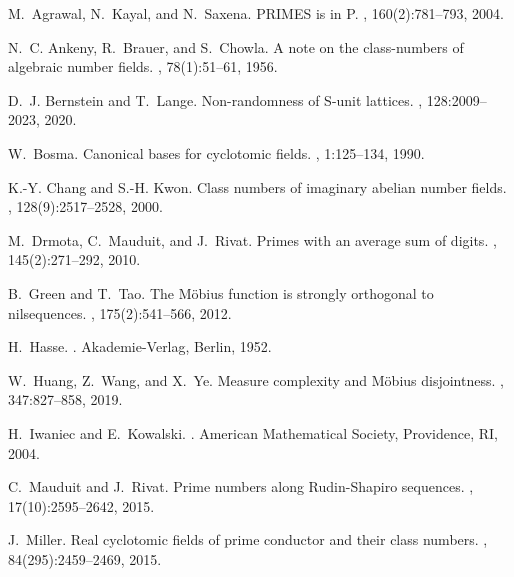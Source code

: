 
\begin{thebibliography}{30}

M.~Agrawal, N.~Kayal, and N.~Saxena.
\newblock PRIMES is in P.
, 160(2):781--793, 2004.

N.~C. Ankeny, R.~Brauer, and S.~Chowla.
\newblock A note on the class-numbers of algebraic number fields.
, 78(1):51--61, 1956.

D.~J. Bernstein and T.~Lange.
\newblock Non-randomness of {S}-unit lattices.
, 128:2009--2023, 2020.

W.~Bosma.
\newblock Canonical bases for cyclotomic fields.
,
  1:125--134, 1990.

K.-Y. Chang and S.-H. Kwon.
\newblock Class numbers of imaginary abelian number fields.
,
  128(9):2517--2528, 2000.

M.~Drmota, C.~Mauduit, and J.~Rivat.
\newblock Primes with an average sum of digits.
, 145(2):271--292, 2010.

B.~Green and T.~Tao.
\newblock The {M}öbius function is strongly orthogonal to nilsequences.
, 175(2):541--566, 2012.

H.~Hasse.
.
\newblock Akademie-Verlag, Berlin, 1952.

W.~Huang, Z.~Wang, and X.~Ye.
\newblock Measure complexity and {M}öbius disjointness.
, 347:827--858, 2019.

H.~Iwaniec and E.~Kowalski.
.
\newblock American Mathematical Society, Providence, RI, 2004.

C.~Mauduit and J.~Rivat.
\newblock Prime numbers along {R}udin-{S}hapiro sequences.
, 17(10):2595--2642,
  2015.

J.~Miller.
\newblock Real cyclotomic fields of prime conductor and their class numbers.
, 84(295):2459--2469, 2015.


\end{thebibliography}
